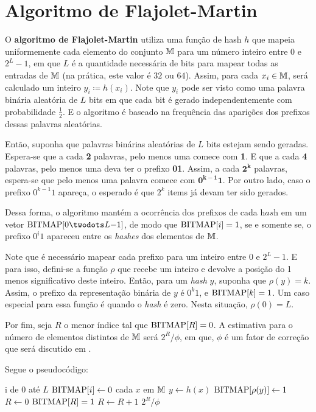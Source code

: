 \section{Algoritmo de Flajolet-Martin}
\label{sec:flajolet-martin:algorithm}

O \textbf{algoritmo de Flajolet-Martin} utiliza uma função de hash $h$ que mapeia uniformemente cada elemento do 
conjunto $\mathbb{M}$ para um número inteiro entre $0$ e $2^L-1$, em que $L$ é a quantidade necessária de bits para 
mapear todas as entradas de $\mathbb{M}$ (na prática, este valor é $32$ ou $64$). Assim, para cada $x_i \in \mathbb{M}$, 
será calculado um inteiro $y_i \coloneqq h(x_i)$. Note que $y_i$ pode ser visto como uma palavra binária aleatória de 
$L$ bits em que cada bit é gerado independentemente com probabilidade $\frac{1}{2}$. E o algoritmo é baseado na 
frequência das aparições dos prefixos dessas palavras aleatórias.

Então, suponha que palavras binárias aleatórias de $L$ bits estejam sendo geradas. Espera-se que a cada \textbf{2} 
palavras, pelo menos uma comece com \textbf{1}. E que a cada \textbf{4} palavras, pelo menos uma deva ter o prefixo 
\textbf{01}. Assim, a cada $\mathbf{2^k}$ palavras, espera-se que pelo menos uma palavra comece com $\mathbf{0^{k-1}1}$. 
Por outro lado, caso o prefixo $0^{k-1}1$ apareça, o esperado é que $2^{k}$ items já devam ter sido gerados. 

Dessa forma, o algoritmo mantém a ocorrência dos prefixos de cada $\textit{hash}$ em um vetor 
$\bitmap[0 \twodots L{-}1]$, de modo que $\text{BITMAP}[i] = 1$, se e somente se, o prefixo $0^i1$ apareceu entre os 
\textit{hashes} dos elementos de $\mathbb{M}$. 

Note que é necessário mapear cada prefixo para um inteiro entre $0$ e $2^{L} - 1$. E para isso, defini-se a função $\rho$ 
que recebe um inteiro e devolve a posição do 1 menos significativo deste inteiro. Então, para um \textit{hash} $y$, 
suponha que $\rho(y) = k$. Assim, o prefixo da representação binária de $y$ é $0^k1$, e $\text{BITMAP}[k] = 1$. Um caso 
especial para essa função é quando o \textit{hash} é zero. Nesta situação, $\rho(0) = L$.

Por fim, seja $R$ o menor índice tal que $\text{BITMAP}[R] = 0$. A estimativa para o número de elementos distintos de 
$\mathbb{M}$ será $2^R/\phi$, em que, $\phi$ é um fator de correção que será discutido em 
.

Segue o pseudocódigo:
\begin{codebox}
  \li \For i de $0$ até $L$
      \Do
  \li    $\text{BITMAP}[i] \gets 0$
      \End
  \li \For cada $x$ em $\mathbb{M}$
      \Do
  \li   $y \gets h(x)$
  \li   $\text{BITMAP}[\rho(y)] \gets 1$
      \End
  \li $R \gets 0$
  \li \While $\text{BITMAP}[R] = 1$
      \Do
  \li   $R \gets R + 1$
      \End
  \li
  \Return $2^R/\phi$
  \End
\end{codebox}

